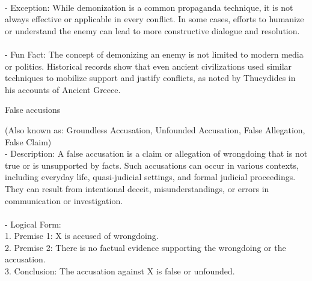\documentclass[a4paper,12pt,single,pdftex]{scrbook}
\begin{document}
{    
      
    \\

    
      - Exception: While demonization is a common propaganda technique, it is not always effective or applicable in every conflict. In some cases, efforts to humanize or understand the enemy can lead to more constructive dialogue and resolution.
    \\

    
      
    \\

    
      - Fun Fact: The concept of demonizing an enemy is not limited to modern media or politics. Historical records show that even ancient civilizations used similar techniques to mobilize support and justify conflicts, as noted by Thucydides in his accounts of Ancient Greece.
    \\

  }


False accusions
    
      (Also known as: Groundless Accusation, Unfounded Accusation, False Allegation, False Claim)
    \\

  
    
      - Description: A false accusation is a claim or allegation of wrongdoing that is not true or is unsupported by facts. Such accusations can occur in various contexts, including everyday life, quasi-judicial settings, and formal judicial proceedings. They can result from intentional deceit, misunderstandings, or errors in communication or investigation.
    \\

    
      
    \\

    
      - Logical Form:
    \\

    
        1. Premise 1: X is accused of wrongdoing.
    \\

    
        2. Premise 2: There is no factual evidence supporting the wrongdoing or the accusation.
    \\

    
        3. Conclusion: The accusation against X is false or unfounded.
    \\

    
      
    \\
\end{document}
